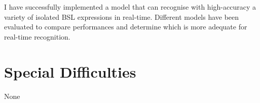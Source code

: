 \documentclass[final,rdr32.tex]{subfiles}
\begin{document}

I have successfully implemented a model that can recognise with high-accuracy a variety of isolated BSL expressions in real-time. Different models have been evaluated to compare performances and determine which is more adequate for real-time recognition.

\section*{Special Difficulties}

None
\end{document}
